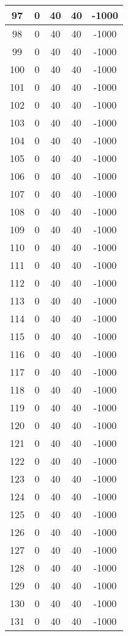 \documentclass[letterpaper, 12pt]{article}
\begin{document}
\begin{longtable}{|c|c|c|c|c|}
\hline
97 & 0 & 40 & 40 & -1000 \\
\hline
98 & 0 & 40 & 40 & -1000 \\
\hline
99 & 0 & 40 & 40 & -1000 \\
\hline
100 & 0 & 40 & 40 & -1000 \\
\hline
101 & 0 & 40 & 40 & -1000 \\
\hline
102 & 0 & 40 & 40 & -1000 \\
\hline
103 & 0 & 40 & 40 & -1000 \\
\hline
104 & 0 & 40 & 40 & -1000 \\
\hline
105 & 0 & 40 & 40 & -1000 \\
\hline
106 & 0 & 40 & 40 & -1000 \\
\hline
107 & 0 & 40 & 40 & -1000 \\
\hline
108 & 0 & 40 & 40 & -1000 \\
\hline
109 & 0 & 40 & 40 & -1000 \\
\hline
110 & 0 & 40 & 40 & -1000 \\
\hline
111 & 0 & 40 & 40 & -1000 \\
\hline
112 & 0 & 40 & 40 & -1000 \\
\hline
113 & 0 & 40 & 40 & -1000 \\
\hline
114 & 0 & 40 & 40 & -1000 \\
\hline
115 & 0 & 40 & 40 & -1000 \\
\hline
116 & 0 & 40 & 40 & -1000 \\
\hline
117 & 0 & 40 & 40 & -1000 \\
\hline
118 & 0 & 40 & 40 & -1000 \\
\hline
119 & 0 & 40 & 40 & -1000 \\
\hline
120 & 0 & 40 & 40 & -1000 \\
\hline
121 & 0 & 40 & 40 & -1000 \\
\hline
122 & 0 & 40 & 40 & -1000 \\
\hline
123 & 0 & 40 & 40 & -1000 \\
\hline
124 & 0 & 40 & 40 & -1000 \\
\hline
125 & 0 & 40 & 40 & -1000 \\
\hline
126 & 0 & 40 & 40 & -1000 \\
\hline
127 & 0 & 40 & 40 & -1000 \\
\hline
128 & 0 & 40 & 40 & -1000 \\
\hline
129 & 0 & 40 & 40 & -1000 \\
\hline
130 & 0 & 40 & 40 & -1000 \\
\hline
131 & 0 & 40 & 40 & -1000 \\

\end{longtable}
\end{document}
